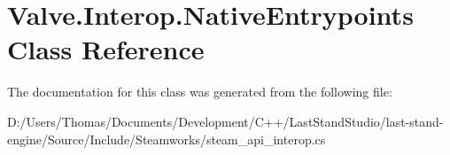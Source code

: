 \hypertarget{classValve_1_1Interop_1_1NativeEntrypoints}{}\section{Valve.\+Interop.\+Native\+Entrypoints Class Reference}
\label{classValve_1_1Interop_1_1NativeEntrypoints}


The documentation for this class was generated from the following file\+:\begin{DoxyCompactItemize}
\item 
D\+:/\+Users/\+Thomas/\+Documents/\+Development/\+C++/\+Last\+Stand\+Studio/last-\/stand-\/engine/\+Source/\+Include/\+Steamworks/steam\+\_\+api\+\_\+interop.\+cs\end{DoxyCompactItemize}
